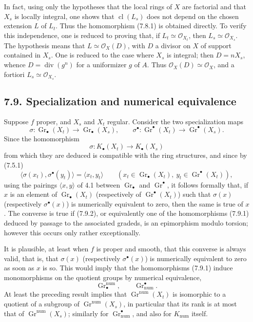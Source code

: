 \documentclass[11pt]{article}
\newcommand{\Gr}{\operatorname{Gr}}
\newcommand{\cl}{\operatorname{cl}}
\providecommand{\Gr}{\operatorname{Gr}}
\providecommand{\Gr}{\operatorname{G}}
\begin{document}
In fact, using only the hypotheses that the local rings of \(X\) are factorial and that \(X_s\) is locally integral, one shows that \(\cl(L_s)\) does not depend on the chosen extension \(L\) of \(L_t\). Thus the homomorphism (7.8.1) is obtained directly. To verify this independence, one is reduced to proving that, if \(L_t\simeq\mathcal O_{X_t}\), then \(L_s\simeq\mathcal O_{X_s}\). The hypothesis means that \(L\simeq\mathcal O_X(D)\), with \(D\) a divisor on \(X\) of support contained in \(X_s\). One is reduced to the case where \(X_s\) is integral; then \(D=nX_s\), whence \(D=\operatorname{div}(g^n)\) for a uniformizer \(g\) of \(A\). Thus \(\mathcal O_X(D)\simeq\mathcal O_X\), and a fortiori \(L_s\simeq\mathcal O_{X_s}\).

\subsection*{7.9. Specialization and numerical equivalence}
Suppose \(f\) proper, and \(X_s\) and \(X_t\) regular. Consider the two specialization maps
\begin{equation}\tag{7.9.1}
  \sigma:\Gr_\bullet(X_t)\longrightarrow\Gr_\bullet(X_s),
  \qquad
  \sigma^\bullet:\Gr^\bullet(X_t)\longrightarrow\Gr^\bullet(X_s).
\end{equation}
Since the homomorphism
\begin{equation}\tag{7.9.2}
  \sigma:K_\bullet(X_t)\longrightarrow K_\bullet(X_s)
\end{equation}
from which they are deduced is compatible with the ring structures, and since by (7.5.1)
\[
  \langle\sigma(x_t),\sigma^\bullet(y_t)\rangle
  =
  \langle x_t,y_t\rangle
  \qquad
  (x_t\in\Gr_\bullet(X_t),\ y_t\in\Gr^\bullet(X_t)),
\tag{7.9.3}
\]
using the pairings \(\langle x,y\rangle\) of 4.1 between \(\Gr_\bullet\) and \(\Gr^\bullet\), it follows formally that, if \(x\) is an element of \(\Gr_\bullet(X_t)\) (respectively of \(\Gr^\bullet(X_t)\)) such that \(\sigma(x)\) (respectively \(\sigma^\bullet(x)\)) is numerically equivalent to zero, then the same is true of \(x\). The converse is true if (7.9.2), or equivalently one of the homomorphisms (7.9.1) deduced by passage to the associated gradeds, is an epimorphism modulo torsion; however this occurs only rather exceptionally.

It is plausible, at least when \(f\) is proper and smooth, that this converse is always valid, that is, that \(\sigma(x)\) (respectively \(\sigma^\bullet(x)\)) is numerically equivalent to zero as soon as \(x\) is so. This would imply that the homomorphisms (7.9.1) induce monomorphisms on the quotient groups by numerical equivalence,
\[
  \Gr^{\mathrm{num}}_\bullet,\qquad
  \Gr_{\mathrm{num}}^\bullet.
\]
At least the preceding result implies that \(\Gr^{\mathrm{num}}(X_t)\) is isomorphic to a quotient of a subgroup of \(\Gr^{\mathrm{num}}(X_s)\), in particular that its rank is at most that of \(\Gr^{\mathrm{num}}(X_s)\); similarly for \(\Gr_{\mathrm{num}}^\bullet\), and also for \(K_{\mathrm{num}}\) itself.
\end{document}
